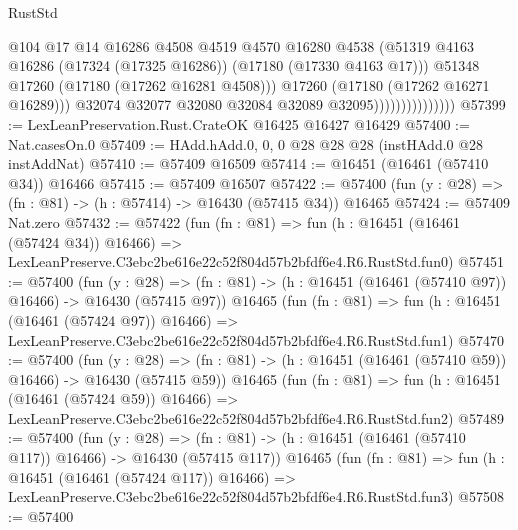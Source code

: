 \begin{lexlean}{RustStd}
\begin{coremodule}
                                      @104
                                      @17
                                      @14
                                      @16286
                                      @4508
                                      @4519
                                      @4570
                                      @16280
                                      @4538
                                      (@51319
                                        @4163
                                        @16286
                                        (@17324 (@17325 @16286))
                                        (@17180 (@17330 @4163 @17)))
                                      @51348
                                      @17260
                                      (@17180 (@17262 @16281 @4508)))
                                    @17260
                                    (@17180 (@17262 @16271 @16289)))
                                  @32074
                                  @32077
                                  @32080
                                  @32084
                                  @32089
                                  @32095)))))))))))))))
@57399 := LexLeanPreservation.Rust.CrateOK @16425 @16427 @16429
@57400 := Nat.casesOn.{0}
@57409 := HAdd.hAdd.{0, 0, 0} @28 @28 @28 (instHAdd.{0} @28 instAddNat)
@57410 := @57409 @16509
@57414 := @16451 (@16461 (@57410 @34)) @16466
@57415 := @57409 @16507
@57422 := @57400 (fun (y : @28) => (fn : @81) -> (h : @57414) -> @16430 (@57415 @34)) @16465
@57424 := @57409 Nat.zero
@57432 := @57422
    (fun (fn : @81) =>
    fun (h : @16451 (@16461 (@57424 @34)) @16466) =>
    LexLeanPreserve.C3ebc2be616e22c52f804d57b2bfdf6e4.R6.RustStd.fun0)
@57451 := @57400
    (fun (y : @28) =>
    (fn : @81) -> (h : @16451 (@16461 (@57410 @97)) @16466) -> @16430 (@57415 @97))
    @16465
    (fun (fn : @81) =>
    fun (h : @16451 (@16461 (@57424 @97)) @16466) =>
    LexLeanPreserve.C3ebc2be616e22c52f804d57b2bfdf6e4.R6.RustStd.fun1)
@57470 := @57400
    (fun (y : @28) =>
    (fn : @81) -> (h : @16451 (@16461 (@57410 @59)) @16466) -> @16430 (@57415 @59))
    @16465
    (fun (fn : @81) =>
    fun (h : @16451 (@16461 (@57424 @59)) @16466) =>
    LexLeanPreserve.C3ebc2be616e22c52f804d57b2bfdf6e4.R6.RustStd.fun2)
@57489 := @57400
    (fun (y : @28) =>
    (fn : @81) -> (h : @16451 (@16461 (@57410 @117)) @16466) -> @16430 (@57415 @117))
    @16465
    (fun (fn : @81) =>
    fun (h : @16451 (@16461 (@57424 @117)) @16466) =>
    LexLeanPreserve.C3ebc2be616e22c52f804d57b2bfdf6e4.R6.RustStd.fun3)
@57508 := @57400

\end{coremodule}
\end{lexlean}
